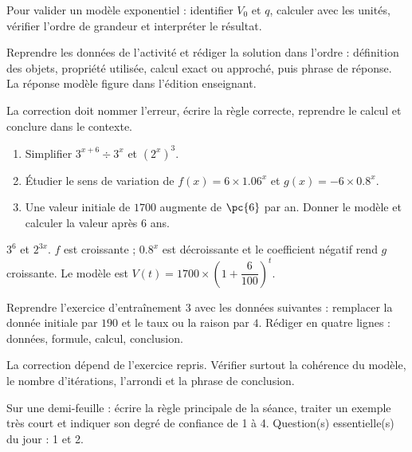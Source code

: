 \begin{summary}Pour valider un modèle exponentiel : identifier $V_0$ et $q$, calculer avec les unités, vérifier l'ordre de grandeur et interpréter le résultat.\end{summary}

\begin{example}
Reprendre les données de l'activité et rédiger la solution dans l'ordre : définition des objets, propriété utilisée, calcul exact ou approché, puis phrase de réponse. La réponse modèle figure dans l'édition enseignant.
\end{example}
\begin{solution}La correction doit nommer l'erreur, écrire la règle correcte, reprendre le calcul et conclure dans le contexte.\end{solution}

\begin{exercise}[essentiel]
\begin{enumerate}\item Simplifier $3^{x+6}\div3^x$ et $(2^x)^3$.\item Étudier le sens de variation de $f(x)=6\times\num{1,06}^x$ et $g(x)=-6\times\num{0,8}^x$.\item Une valeur initiale de $1700$ augmente de $\pc{6}$ par an. Donner le modèle et calculer la valeur après $6$ ans.\end{enumerate}
\end{exercise}
\begin{solution}$3^6$ et $2^{3x}$. $f$ est croissante ; $\num{0,8}^x$ est décroissante et le coefficient négatif rend $g$ croissante. Le modèle est $V(t)=1700\times\left(1+\dfrac{6}{100}\right)^t$.\end{solution}


\begin{homework}Reprendre l'exercice d'entraînement 3 avec les données suivantes : remplacer la donnée initiale par $190$ et le taux ou la raison par $4$. Rédiger en quatre lignes : données, formule, calcul, conclusion.\end{homework}
\begin{solution}La correction dépend de l'exercice repris. Vérifier surtout la cohérence du modèle, le nombre d'itérations, l'arrondi et la phrase de conclusion.\end{solution}

\begin{exitticket}[3 minutes]Sur une demi-feuille : écrire la règle principale de la séance, traiter un exemple très court et indiquer son degré de confiance de 1 à 4. Question(s) essentielle(s) du jour : 1 et 2.\end{exitticket}

